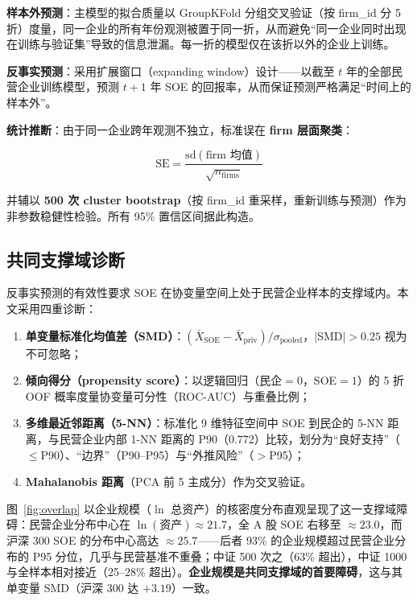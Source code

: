 \documentclass[11pt,a4paper]{ctexart}
\begin{document}
\textbf{样本外预测}：主模型的拟合质量以 GroupKFold 分组交叉验证（按 firm\_id 分 5 折）度量，同一企业的所有年份观测被置于同一折，从而避免“同一企业同时出现在训练与验证集”导致的信息泄漏。每一折的模型仅在该折以外的企业上训练。

\textbf{反事实预测}：采用扩展窗口（expanding window）设计——以截至 $t$ 年的全部民营企业训练模型，预测 $t+1$ 年 SOE 的回报率，从而保证预测严格满足“时间上的样本外”。

\textbf{统计推断}：由于同一企业跨年观测不独立，标准误在 \textbf{firm 层面聚类}：

\begin{equation}
\text{SE} = \frac{\text{sd}(\text{firm 均值})}{\sqrt{n_{\text{firms}}}}
\end{equation}

并辅以 \textbf{500 次 cluster bootstrap}（按 firm\_id 重采样，重新训练与预测）作为非参数稳健性检验。所有 95\% 置信区间据此构造。

\subsection{共同支撑域诊断}

反事实预测的有效性要求 SOE 在协变量空间上处于民营企业样本的支撑域内。本文采用四重诊断：

\begin{enumerate}[leftmargin=2em,itemsep=0pt]
\item \textbf{单变量标准化均值差（SMD）}：$(\bar X_{\text{SOE}}-\bar X_{\text{priv}})/\sigma_{\text{pooled}}$，$|$SMD$|>0.25$ 视为不可忽略；
\item \textbf{倾向得分（propensity score）}：以逻辑回归（民企$=0$，SOE$=1$）的 5 折 OOF 概率度量协变量可分性（ROC-AUC）与重叠比例；
\item \textbf{多维最近邻距离（5-NN）}：标准化 9 维特征空间中 SOE 到民企的 5-NN 距离，与民营企业内部 1-NN 距离的 P90（0.772）比较，划分为“良好支持”（$\le$P90）、“边界”（P90--P95）与“外推风险”（$>$P95）；
\item \textbf{Mahalanobis 距离}（PCA 前 5 主成分）作为交叉验证。
\end{enumerate}

图~\ref{fig:overlap} 以企业规模（$\ln$ 总资产）的核密度分布直观呈现了这一支撑域障碍：民营企业分布中心在 $\ln(\text{资产})\approx21.7$，全 A 股 SOE 右移至 $\approx23.0$，而沪深 300 SOE 的分布中心高达 $\approx25.7$——后者 93\% 的企业规模超过民营企业分布的 P95 分位，几乎与民营基准不重叠；中证 500 次之（63\% 超出），中证 1000 与全样本相对接近（25--28\% 超出）。\textbf{企业规模是共同支撑域的首要障碍}，这与其单变量 SMD（沪深 300 达 $+3.19$）一致。
\end{document}
